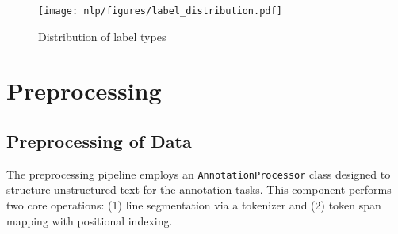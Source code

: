 \documentclass[9pt,a4paper,twoside]{tau-class/tau}
\begin{document}
    \begin{figure}[H]
        \centering
        \texttt{[image: nlp/figures/label\_distribution.pdf]}
        \caption{Distribution of label types}
        \label{fig:distribution-labels}
    \end{figure}
    

\section{Preprocessing} \label{sec:prep}
        
                


        

    \subsection{Preprocessing of Data}
    The preprocessing pipeline employs an \lstinline|AnnotationProcessor| class designed to structure unstructured text for the annotation tasks. This component performs two core operations: (1) line segmentation via a tokenizer and (2) token span mapping with positional indexing.
\end{document}
